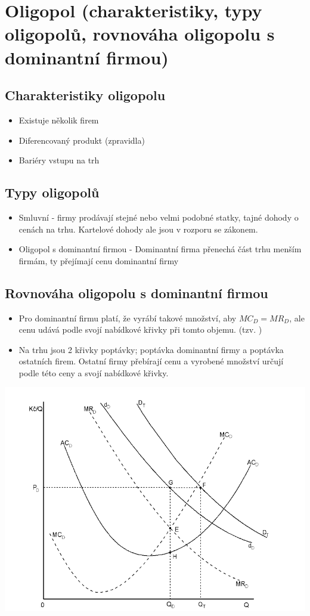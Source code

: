 \clearpage
\section{Oligopol (charakteristiky, typy oligopolů, rovnováha oligopolu s dominantní firmou)}

\subsection{Charakteristiky oligopolu}
\begin{itemize}
    \item Existuje několik firem
    \item Diferencovaný produkt (zpravidla)
    \item Bariéry vstupu na trh
\end{itemize}

\subsection{Typy oligopolů}
\begin{itemize}
    \item Smluvní - firmy prodávají stejné nebo velmi podobné statky, tajné dohody o cenách na trhu. Kartelové dohody ale jsou v rozporu se zákonem.
    \item Oligopol s dominantní firmou - Dominantní firma přenechá část trhu menším firmám, ty přejímají cenu dominantní firmy
\end{itemize}

\subsection{Rovnováha oligopolu s dominantní firmou}
\begin{itemize}
    \item Pro dominantní firmu platí, že vyrábí takové množství, aby $MC_D=MR_D$, ale cenu udává podle svojí nabídkové křivky při tomto objemu. (tzv. )
    \item Na trhu jsou 2 křivky poptávky; poptávka dominantní firmy a poptávka ostatních firem. Ostatní firmy přebírají cenu a vyrobené množství určují podle této ceny a svojí nabídkové křivky.
\end{itemize}
\includegraphics[width=16cm]{images/14_rovnovaha.png}
